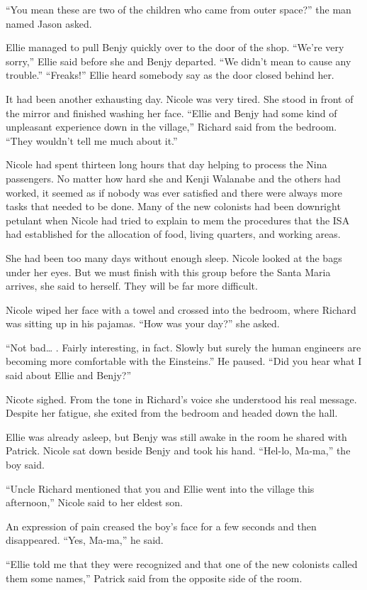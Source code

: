\documentclass[]{article}
\begin{document}
{“You mean these are two of the children who came from outer space?” the man named Jason asked.

Ellie managed to pull Benjy quickly over to the door of the shop. “We’re very sorry,” Ellie said before she and Benjy departed. “We didn’t mean to cause any trouble.” “Freaks!” Ellie heard somebody say as the door closed behind her.

It had been another exhausting day. Nicole was very tired. She stood in front of the mirror and finished washing her face. “Ellie and Benjy had some kind of unpleasant experience down in the village,” Richard said from the bedroom. “They wouldn’t tell me much about it.”

Nicole had spent thirteen long hours that day helping to process the Nina passengers. No matter how hard she and Kenji Walanabe and the others had worked, it seemed as if nobody was ever satisfied and there were always more tasks that needed to be done. Many of the new colonists had been downright petulant when Nicole had tried to explain to mem the procedures that the ISA had established for the allocation of food, living quarters, and working areas.

She had been too many days without enough sleep. Nicole looked at the bags under her eyes. But we must finish with this group before the Santa Maria arrives, she said to herself. They will be far more difficult.

Nicole wiped her face with a towel and crossed into the bedroom, where Richard was sitting up in his pajamas. “How was your day?” she asked.

“Not bad… . Fairly interesting, in fact. Slowly but surely the human engineers are becoming more comfortable with the Einsteins.” He paused. “Did you hear what I said about Ellie and Benjy?”

Nicote sighed. From the tone in Richard’s voice she understood his real message. Despite her fatigue, she exited from the bedroom and headed down the hall.

Ellie was already asleep, but Benjy was still awake in the room he shared with Patrick. Nicole sat down beside Benjy and took his hand. “Hel-lo, Ma-ma,” the boy said.

“Uncle Richard mentioned that you and Ellie went into the village this afternoon,” Nicole said to her eldest son.

An expression of pain creased the boy’s face for a few seconds and then disappeared. “Yes, Ma-ma,” he said.

“Ellie told me that they were recognized and that one of the new colonists called them some names,” Patrick said from the opposite side of the room.

}
\end{document}
